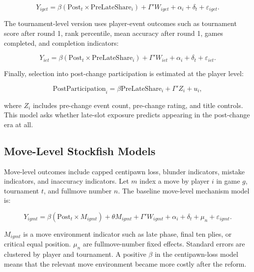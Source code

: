 \begin{equation}
\label{eq:timeslotgame}
Y_{iget}
= \beta(\text{Post}_t \times \text{PreLateShare}_i)
+ \Gamma' W_{iget}
+ \alpha_i
+ \delta_t
+ \varepsilon_{iget}.
\end{equation}

The tournament-level version uses player-event outcomes such as tournament score after round 1, rank percentile, mean accuracy after round 1, games completed, and completion indicators:

\begin{equation}
\label{eq:timeslottournament}
Y_{iet}
= \beta(\text{Post}_t \times \text{PreLateShare}_i)
+ \Gamma' W_{iet}
+ \alpha_i
+ \delta_t
+ \varepsilon_{iet}.
\end{equation}

Finally, selection into post-change participation is estimated at the player level:

\begin{equation}
\label{eq:participation}
\text{PostParticipation}_{i}
= \beta \text{PreLateShare}_{i}
+ \Gamma' Z_i
+ u_i,
\end{equation}

\noindent where \(Z_i\) includes pre-change event count, pre-change rating, and title controls. This model asks whether late-slot exposure predicts appearing in the post-change era at all.

\subsection{Move-Level Stockfish Models}

Move-level outcomes include capped centipawn loss, blunder indicators, mistake indicators, and inaccuracy indicators. Let \(m\) index a move by player \(i\) in game \(g\), tournament \(t\), and fullmove number \(n\). The baseline move-level mechanism model is:

\begin{equation}
\label{eq:movelevel}
Y_{igmt}
= \beta(\text{Post}_t \times M_{igmt})
+ \theta M_{igmt}
+ \Gamma' W_{igmt}
+ \alpha_i
+ \delta_t
+ \mu_n
+ \varepsilon_{igmt}.
\end{equation}

\noindent \(M_{igmt}\) is a move environment indicator such as late phase, final ten plies, or critical equal position. \(\mu_n\) are fullmove-number fixed effects. Standard errors are clustered by player and tournament. A positive \(\beta\) in the centipawn-loss model means that the relevant move environment became more costly after the reform.

